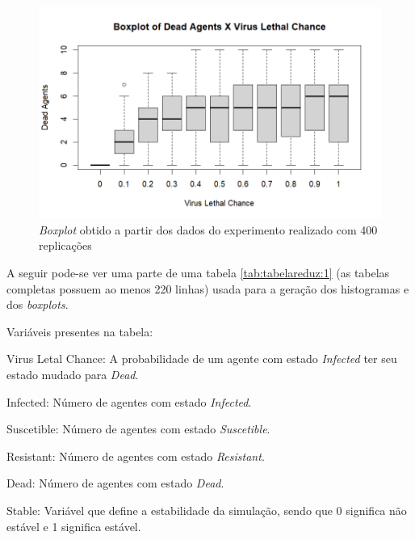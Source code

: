 \begin{figure}[H]
    \centering
    \includegraphics[angle=0,width=1\textwidth]{exploratory-data-analysis/seraphritt/PesqBibliogr/Virus-Network/Boxplot_400_repl.png}
    \caption{\textit{Boxplot} obtido a partir dos dados do experimento realizado com 400 replicações}
    \label{fig:seraphritt:bp4}
\end{figure}

A seguir pode-se ver uma parte de uma tabela \ref{tab:tabelareduz:1} (as tabelas completas possuem ao menos 220 linhas) usada para a geração dos histogramas e dos \textit{boxplots}.

Variáveis presentes na tabela:
\begin{description}
\item Virus Letal Chance:  A probabilidade de um agente com estado \textit{Infected} ter seu estado mudado para \textit{Dead}. 
\item Infected: Número de agentes com estado \textit{Infected}.
\item Suscetible: Número de agentes com estado \textit{Suscetible}.
\item Resistant: Número de agentes com estado \textit{Resistant}.
\item Dead: Número de agentes com estado \textit{Dead}.
\item Stable: Variável que define a estabilidade da simulação, sendo que 0 significa não estável e 1 significa estável.
\end{description}

